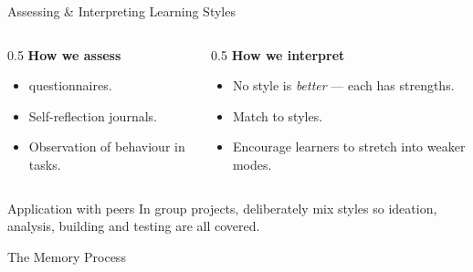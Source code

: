 \begin{frame}{Assessing \& Interpreting Learning Styles}
  \accentrule\\[0.3em]
  \begin{columns}[T]
    \begin{column}{0.5\textwidth}\small
      \textbf{How we assess}
      \begin{itemize}\small
        \item {} questionnaires.
        \item Self-reflection journals.
        \item Observation of behaviour in tasks.
      \end{itemize}
    \end{column}
    \begin{column}{0.5\textwidth}\small
      \textbf{How we interpret}
      \begin{itemize}\small
        \item No style is \emph{better} — each has strengths.
        \item Match  to styles.
        \item Encourage learners to stretch into weaker modes.
      \end{itemize}
    \end{column}
  \end{columns}
  \vspace{0.4em}
  \begin{block}{Application with peers}
    \scriptsize In group projects, deliberately mix styles so ideation,
    analysis, building and testing are all covered.
  \end{block}
\end{frame}

\begin{frame}{The Memory Process}
\end{frame}

